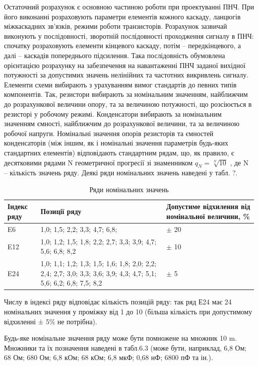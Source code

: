 \documentclass[main.tex]{subfiles}
\begin{document}
Остаточний розрахунок є основною частиною роботи при проектуванні ПНЧ. При його виконанні розраховують параметри елементів кожного каскаду, ланцюгів міжкаскадних зв’язків, режими роботи транзисторів. Розрахунок зазвичай виконують у послідовності, зворотній послідовності проходження сигналу в ПНЧ: спочатку розраховують елементи кінцевого каскаду, потім – передкінцевого, а далі – каскадів попереднього підсилення. Така послідовність обумовлена орієнтацією розрахунку на забезпечення на навантаженні ПНЧ заданої вихідної потужності за допустимих значень нелінійних та частотних викривлень сигналу.
Елементи схеми вибирають з урахуванням вимог стандартів до певних типів
компонентів. Так, резистори вибирають за номінальним значенням, найближчим
до розрахункової величини опору, та за величиною потужності, що розсіюється в
резисторі у робочому режимі. Конденсатори вибирають за номінальним
значенням ємності, найближчим до розрахункової величини, та за величиною
робочої напруги. Номінальні значення опорів резисторів та ємностей конденсаторів (між
іншим, як і номінальні значення параметрів будь-яких стандартних елементів)
відповідають стандартним рядам, що, як правило, є десятковими рядами N геометричної прогресії зі знаменником $q_{N} = \sqrt[N]{10}$ , де N – кількість значень ряду.
Деякі ряди номінальних значень наведені у табл. ?.

\begin{table}[H]
\centering
\caption{Ряди номінальних значень}
\label{tab:standard_values}
\begin{tabular}{|p{4cm}|p{4cm}|p{2.5cm}|}
\hline
\textbf{Індекс ряду} & \textbf{Позиції ряду} & \textbf{Допустиме відхилення від номінальної величини, \%} \\
\hline
E6 & 1,0; 1,5; 2,2; 3,3; 4,7; 6,8; & $\pm$ 20 \\
\hline 
E12 & 1,0; 1,2; 1,5; 1,8; 2,2; 2,7; 3,3; 3,9; 4,7; 5,6; 6,8; 8,2 & $\pm$ 10 \\
\hline
E24 & 1,0; 1,1; 1,2; 1,3; 1,5; 1,6; 1,8; 2,0; 2,2; 2,4; 2,7; 3,0; 3,3; 3,6; 3,9; 4,3; 4,7; 5,1; 5,6; 6,2; 6,8; 7,5; 8,2 & $\pm$ 5 \\
\hline
\end{tabular}
\end{table}

Числу в індексі ряду відповідає кількість позицій ряду: так ряд Е24 має 24
номінальних значення у проміжку від 1 до 10 (більша кількість при допустимому
відхиленні ± 5\% не потрібна).

Будь-яке номінальне значення ряду може бути помножене на множник 10 m.
Множники та їх позначення наведені в табл.6.3 (може бути, наприклад,
6,8 Ом; 68 Ом; 680 Ом; 6,8 кОм; 68 кОм; 6,8 мкФ; 0,68 нФ; 6800 пФ та ін.).
\end{document}
